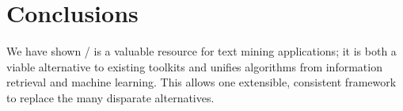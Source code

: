 \section{Conclusions}

We have shown \meta/ is a valuable resource for text mining applications; it is
both a viable alternative to existing toolkits and unifies algorithms from
information retrieval and machine learning. This allows one extensible,
consistent framework to replace the many disparate alternatives.
